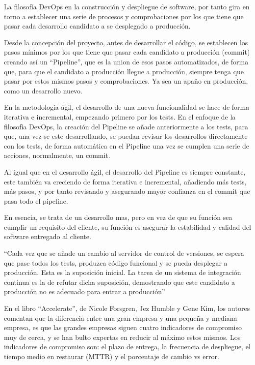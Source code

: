 \documentclass[12pt]{report} %
\begin{document}
La filosofía DevOps en la construcción y despliegue de software, por tanto gira en torno a establecer una serie de procesos y comprobaciones por los que tiene que pasar cada desarrollo candidato a se desplegado a producción. 

Desde la concepción del proyecto, antes de desarrollar el código, se establecen los pasos mínimos por los que tiene que pasar cada candidato a producción (commit) creando así un ``Pipeline'', que es la union de esos pasos automatizados, de forma que, para que el candidato a producción llegue a producción, siempre tenga que pasar por estos mismos pasos y comprobaciones.
Ya sea un apaño en producción, como un desarrollo nuevo.

En la metodología ágil, el desarrollo de una nueva funcionalidad se hace de forma iterativa e incremental, empezando primero por los tests.
En el enfoque de la filosofía DevOps, la creación del Pipeline se añade anteriormente a los tests, para que, una vez se este desarrollando, se puedan revisar los desarrollos directamente con los tests, de forma automática en el Pipeline una vez se cumplen una serie de acciones, normalmente, un commit.

Al igual que en el desarrollo ágil, el desarrollo del Pipeline es siempre constante, este también va creciendo de forma iterativa e incremental, añadiendo más tests, más pasos, y por tanto revisando y asegurando mayor confianza en el commit que pasa todo el pipeline.

En esencia, se trata de un desarrollo mas, pero en vez de que su función sea cumplir un requisito del cliente, su función es asegurar la estabilidad y calidad del software entregado al cliente. 

``Cada vez que se añade un cambio al servidor de control de versiones, se espera que pase todos los tests, produzca código funcional y se pueda desplegar a producción.
Esta es la suposición inicial.
La tarea de un sistema de integración continua es la de refutar dicha suposición, demostrando que este candidato a producción no es adecuado para entrar a producción''\cite{Humble2010}

En el libro ``Accelerate'', de Nicole Forsgren, Jez Humble y Gene Kim, los autores comentan que la diferencia entre una gran empresa y una pequeña y mediana empresa, es que las grandes empresas siguen cuatro indicadores de compromiso muy de cerca, y se han bulto expertas en reducir al máximo estos mismos.
Los indicadores de compromiso son: el plazo de entrega, la frecuencia de despliegue, el tiempo medio en restaurar (MTTR) y el porcentaje de cambio vs error.\cite{Forsgren2018}
\end{document}
